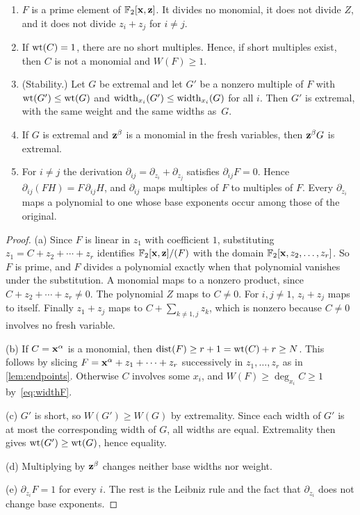 \begin{lemma}\label{lem:basic}
\begin{enumerate}[label=\textup{(\alph*)}]
\item $F$ is a prime element of $\mathbb{F}_2[\mathbf{x},\mathbf{z}]$. It divides no monomial, it does not divide $Z$, and it does not divide $z_i+z_j$ for $i\ne j$.
\item If $\operatorname{wt}(C)=1$, there are no short multiples. Hence, if short multiples exist, then $C$ is not a monomial and $W(F)\ge1$.
\item \textup{(Stability.)} Let $G$ be extremal and let $G'$ be a nonzero multiple of $F$ with $\operatorname{wt}(G')\le\operatorname{wt}(G)$ and $\operatorname{width}_{x_i}(G')\le\operatorname{width}_{x_i}(G)$ for all $i$. Then $G'$ is extremal, with the same weight and the same widths as~$G$.
\item If $G$ is extremal and $\mathbf{z}^\beta$ is a monomial in the fresh variables, then $\mathbf{z}^\beta G$ is extremal.
\item For $i\ne j$ the derivation $\partial_{ij}=\partial_{z_i}+\partial_{z_j}$ satisfies $\partial_{ij}F=0$. Hence $\partial_{ij}(FH)=F\,\partial_{ij}H$, and $\partial_{ij}$ maps multiples of $F$ to multiples of $F$. Every $\partial_{z_i}$ maps a polynomial to one whose base exponents occur among those of the original.
\end{enumerate}
\end{lemma}

\begin{proof}
(a) Since $F$ is linear in $z_1$ with coefficient $1$, substituting $z_1=C+z_2+\cdots+z_r$ identifies $\mathbb{F}_2[\mathbf{x},\mathbf{z}]/(F)$ with the domain $\mathbb{F}_2[\mathbf{x},z_2,\dots,z_r]$. So $F$ is prime, and $F$ divides a polynomial exactly when that polynomial vanishes under the substitution. A monomial maps to a nonzero product, since $C+z_2+\cdots+z_r\ne0$. The polynomial $Z$ maps to $C\ne0$. For $i,j\ne1$, $z_i+z_j$ maps to itself. Finally $z_1+z_j$ maps to $C+\sum_{k\ne1,j}z_k$, which is nonzero because $C\ne0$ involves no fresh variable.

(b) If $C=\mathbf{x}^\alpha$ is a monomial, then $\operatorname{dist}(F)\ge r+1=\operatorname{wt}(C)+r\ge N$. This follows by slicing $F=\mathbf{x}^\alpha+z_1+\cdots+z_r$ successively in $z_1,\dots,z_r$ as in \cref{lem:endpoints}. Otherwise $C$ involves some $x_i$, and $W(F)\ge\deg_{x_i}C\ge1$ by~\eqref{eq:widthF}.

(c) $G'$ is short, so $W(G')\ge W(G)$ by extremality. Since each width of $G'$ is at most the corresponding width of $G$, all widths are equal. Extremality then gives $\operatorname{wt}(G')\ge\operatorname{wt}(G)$, hence equality.

(d) Multiplying by $\mathbf{z}^\beta$ changes neither base widths nor weight.

(e) $\partial_{z_i}F=1$ for every $i$. The rest is the Leibniz rule and the fact that $\partial_{z_i}$ does not change base exponents.
\end{proof}

